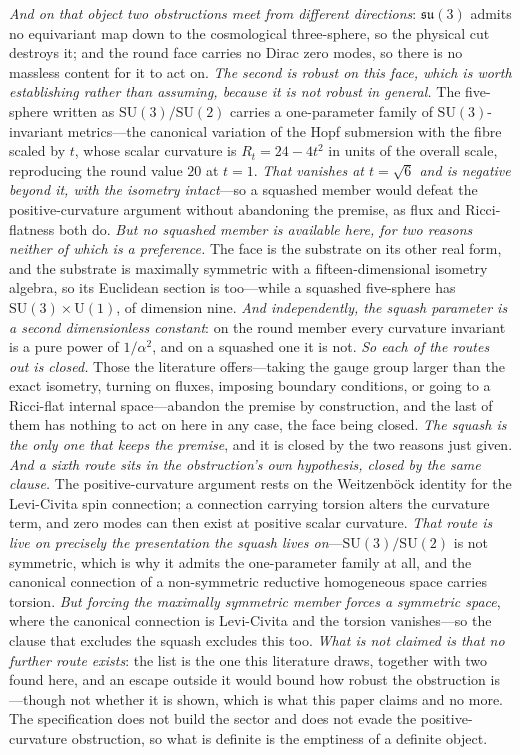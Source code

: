 \documentclass[11pt]{article}
\theoremstyle{plain}
\theoremstyle{remark}
\newcommand{\su}{\mathfrak{su}}
\newcommand{\SU}{\mathrm{SU}}
\begin{document}
\emph{And on that object two obstructions meet from different directions}: $\su(3)$ admits no equivariant map down to the cosmological three-sphere, so the physical cut destroys it; and the round face carries no Dirac zero modes, so there is no massless content for it to act on. \emph{The second is robust on this face, which is worth establishing rather than assuming, because it is not robust in general.} The five-sphere written as $\SU(3)/\SU(2)$ carries a one-parameter family of $\SU(3)$-invariant metrics---the canonical variation of the Hopf submersion with the fibre scaled by $t$, whose scalar curvature is $R_t=24-4t^{2}$ in units of the overall scale, reproducing the round value $20$ at $t=1$. \emph{That vanishes at $t=\sqrt6$ and is negative beyond it, with the isometry intact}---so a squashed member would defeat the positive-curvature argument without abandoning the premise, as flux and Ricci-flatness both do. \emph{But no squashed member is available here, for two reasons neither of which is a preference.} The face is the substrate on its other real form, and the substrate is maximally symmetric with a fifteen-dimensional isometry algebra, so its Euclidean section is too---while a squashed five-sphere has $\SU(3)\times\mathrm{U}(1)$, of dimension nine. \emph{And independently, the squash parameter is a second dimensionless constant}: on the round member every curvature invariant is a pure power of $1/\alpha^{2}$, and on a squashed one it is not. \emph{So each of the routes out is closed.} Those the literature offers---taking the gauge group larger than the exact isometry, turning on fluxes, imposing boundary conditions, or going to a Ricci-flat internal space---abandon the premise by construction, and the last of them has nothing to act on here in any case, the face being closed. \emph{The squash is the only one that keeps the premise}, and it is closed by the two reasons just given. \emph{And a sixth route sits in the obstruction's own hypothesis, closed by the same clause.} The positive-curvature argument rests on the Weitzenb\"ock identity for the Levi-Civita spin connection; a connection carrying torsion alters the curvature term, and zero modes can then exist at positive scalar curvature. \emph{That route is live on precisely the presentation the squash lives on}---$\SU(3)/\SU(2)$ is not symmetric, which is why it admits the one-parameter family at all, and the canonical connection of a non-symmetric reductive homogeneous space carries torsion. \emph{But forcing the maximally symmetric member forces a symmetric space}, where the canonical connection is Levi-Civita and the torsion vanishes---so the clause that excludes the squash excludes this too. \emph{What is not claimed is that no further route exists}: the list is the one this literature draws, together with two found here, and an escape outside it would bound how robust the obstruction is---though not whether it is shown, which is what this paper claims and no more. The specification does not build the sector and does not evade the positive-curvature obstruction, so what is definite is the emptiness of a definite object.
\end{document}
